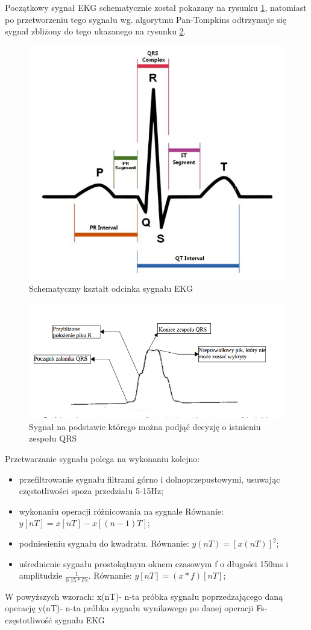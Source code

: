 \documentclass[11pt]{report}
\begin{document}
	Początkowy sygnał EKG schematycznie został pokazany na rysunku \ref{fig:EKG}, natomiast po przetworzeniu tego sygnału wg. algorytmu Pan-Tompkins odtrzymuje się sygnał zbliżony do tego ukazanego na rysunku \ref{fig:sig}.
	
	\begin{figure} [H]
		\centering
		\includegraphics[width=0.5\linewidth]{EKG.png}
		\caption{Schematyczny kształt odcinka sygnału EKG}
		\label{fig:EKG}
	\end{figure}
	\vspace{2cm}
	
	\begin{figure} [H]
		\centering
		\includegraphics[width=0.8\linewidth]{sig.png}
		\caption{Sygnał na podstawie którego można podjąć decyzję o istnieniu zespołu QRS}
		\label{fig:sig}
	\end{figure}
	\vspace{2cm}
	
	Przetwarzanie sygnału polega na wykonaniu kolejno:
	\begin{itemize}
		\item przefiltrowanie sygnału filtrami górno i dolnoprzepustowymi, usuwając częstotliwości spoza przedziału 5-15Hz;
		\item wykonaniu operacji różnicowania na sygnale Równanie: $y[nT]=x[nT]-x[(n-1)T]$; 
		\item podniesieniu sygnału do kwadratu. Równanie: $y(nT)=[x(nT)]^2$;
		\item uśrednienie sygnału prostokątnym oknem czasowym f o długości 150ms i amplitudzie $\frac{1}{0.15*Fs}$. Równanie: $y[nT]=(x*f)[nT]$;
	\end{itemize}
	W powyższych wzorach: \newline
	x(nT)- n-ta próbka sygnału  poprzedzającego daną operację \newline
	y(nT)- n-ta próbka sygnału  wynikowego po danej operacji \newline
	Fs-częstotliwość sygnału EKG \newline
	
\end{document}

